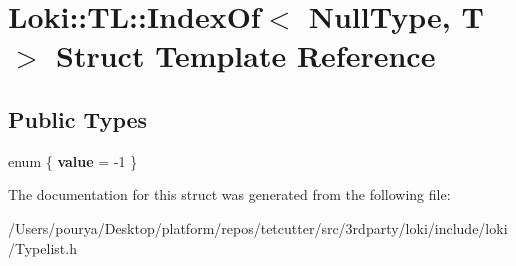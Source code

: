 \hypertarget{structLoki_1_1TL_1_1IndexOf_3_01NullType_00_01T_01_4}{}\section{Loki\+:\+:T\+L\+:\+:Index\+Of$<$ Null\+Type, T $>$ Struct Template Reference}
\label{structLoki_1_1TL_1_1IndexOf_3_01NullType_00_01T_01_4}
\subsection*{Public Types}
\begin{DoxyCompactItemize}
\item 
\hypertarget{structLoki_1_1TL_1_1IndexOf_3_01NullType_00_01T_01_4_a13797d3276044feea06c2272d745f735}{}enum \{ {\bfseries value} = -\/1
 \}\label{structLoki_1_1TL_1_1IndexOf_3_01NullType_00_01T_01_4_a13797d3276044feea06c2272d745f735}

\end{DoxyCompactItemize}


The documentation for this struct was generated from the following file\+:\begin{DoxyCompactItemize}
\item 
/\+Users/pourya/\+Desktop/platform/repos/tetcutter/src/3rdparty/loki/include/loki/Typelist.\+h\end{DoxyCompactItemize}

